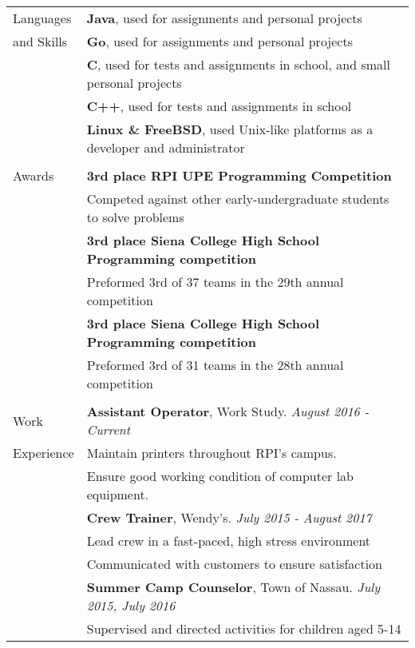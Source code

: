 \documentclass[letterpaper,10pt,oneside]{article}
\begin{document}
\begin{tabular}{@{} l l}
  \Large{Languages}
  & \textbf{Java}, used for assignments and personal projects \\
  \Large{and Skills}
  & \textbf{Go}, used for assignments and personal projects \\
  & \textbf{C}, used for tests and assignments in school, and small personal projects \\
  & \textbf{C++}, used for tests and assignments in school \\
  & \textbf{Linux \& FreeBSD}, used Unix-like platforms as a developer and administrator \\
  & \\

  \Large{Awards}
  & \textbf{3rd place RPI UPE Programming Competition} \\
  & Competed against other early-undergraduate students to solve problems \\
  & \textbf{3rd place Siena College High School Programming competition} \\
  & Preformed 3rd of 37 teams in the 29th annual competition \\
  & \textbf{3rd place Siena College High School Programming competition} \\
  & Preformed 3rd of 31 teams in the 28th annual competition \\
  & \\

  \Large{Work}
  & \textbf{Assistant Operator}, Work Study. \textit{August 2016 - Current} \\
  \Large{Experience}
  & Maintain printers throughout RPI's campus. \\
  & Ensure good working condition of computer lab equipment. \\
  & \textbf{Crew Trainer}, Wendy's. \textit{July 2015 - August 2017} \\
  & Lead crew in a fast-paced, high stress environment \\
  & Communicated with customers to ensure satisfaction \\
  & \textbf{Summer Camp Counselor}, Town of Nassau. \textit{July 2015, July 2016} \\
  & Supervised and directed activities for children aged 5-14 \\

\end{tabular}
\end{document}
